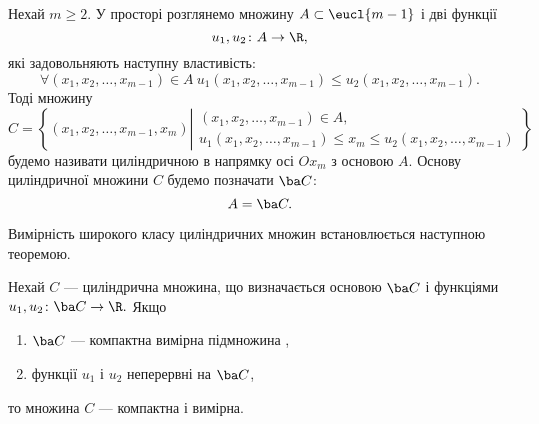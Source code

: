 \begin{definition}
Нехай ${m\geq2}$. У просторі  розглянемо множину ${A \subset \eucl{m-1}}$ і дві функції
\[
u_1,u_2\colon A\to \R,
\]
які задовольняють наступну властивість:
\[
\forall \left(x_1, x_2, \ldots, x_{m-1}\right)\in A\ u_1\left(x_1, x_2, \ldots, x_{m-1}\right)\leq u_2\left(x_1, x_2, \ldots, x_{m-1}\right).
\]
Тоді множину
\[
C =
\left\{
\left(x_1, x_2, \ldots, x_{m-1}, x_m\right)
\left|
\begin{array}{c}
\left(x_1, x_2, \ldots, x_{m-1}\right)\in A,\\
u_1\left(x_1, x_2, \ldots, x_{m-1}\right)\leq x_m \leq u_2\left(x_1, x_2, \ldots, x_{m-1}\right)
\end{array}
\right.
\right\}
\]
будемо називати циліндричною в напрямку осі ${Ox_m}$ з основою $A$. Основу циліндричної множини $C$ будемо позначати ${\ba C}$:
\[
A = \ba C.
\]
\end{definition}
Вимірність широкого класу циліндричних множин встановлюється наступною теоремою.
\begin{theorem}
Нехай $C$ --- циліндрична множина, що визначається основою $\ba C$ і функціями ${u_1, u_2\colon \ba C\to \R.}$ Якщо
\begin{enumerate}
\item $\ba C$ --- компактна вимірна підмножина ,
\item функції $u_1$ і $u_2$ неперервні на $\ba C$,
\end{enumerate}
то множина $C$ --- компактна і вимірна.
\end{theorem}
